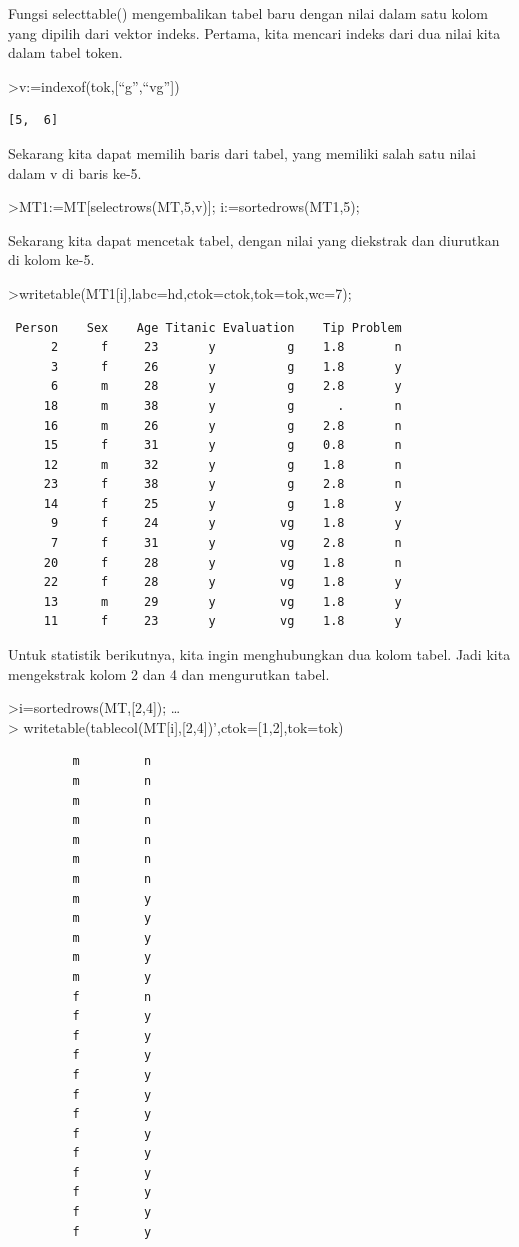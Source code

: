 \documentclass[
]{book}
\begin{document}
Fungsi selecttable() mengembalikan tabel baru dengan nilai dalam satu kolom yang dipilih dari vektor indeks. Pertama, kita mencari indeks dari dua nilai kita dalam tabel token.

\textgreater v:=indexof(tok,{[}``g'',``vg''{]})

\begin{verbatim}
[5,  6]
\end{verbatim}

Sekarang kita dapat memilih baris dari tabel, yang memiliki salah satu nilai dalam v di baris ke-5.

\textgreater MT1:=MT{[}selectrows(MT,5,v){]}; i:=sortedrows(MT1,5);

Sekarang kita dapat mencetak tabel, dengan nilai yang diekstrak dan diurutkan di kolom ke-5.

\textgreater writetable(MT1{[}i{]},labc=hd,ctok=ctok,tok=tok,wc=7);

\begin{verbatim}
 Person    Sex    Age Titanic Evaluation    Tip Problem
      2      f     23       y          g    1.8       n
      3      f     26       y          g    1.8       y
      6      m     28       y          g    2.8       y
     18      m     38       y          g      .       n
     16      m     26       y          g    2.8       n
     15      f     31       y          g    0.8       n
     12      m     32       y          g    1.8       n
     23      f     38       y          g    2.8       n
     14      f     25       y          g    1.8       y
      9      f     24       y         vg    1.8       y
      7      f     31       y         vg    2.8       n
     20      f     28       y         vg    1.8       n
     22      f     28       y         vg    1.8       y
     13      m     29       y         vg    1.8       y
     11      f     23       y         vg    1.8       y
\end{verbatim}

Untuk statistik berikutnya, kita ingin menghubungkan dua kolom tabel. Jadi kita mengekstrak kolom 2 dan 4 dan mengurutkan tabel.

\textgreater i=sortedrows(MT,{[}2,4{]}); \ldots{}\\
\textgreater{} writetable(tablecol(MT{[}i{]},{[}2,4{]})',ctok={[}1,2{]},tok=tok)

\begin{verbatim}
         m         n
         m         n
         m         n
         m         n
         m         n
         m         n
         m         n
         m         y
         m         y
         m         y
         m         y
         m         y
         f         n
         f         y
         f         y
         f         y
         f         y
         f         y
         f         y
         f         y
         f         y
         f         y
         f         y
         f         y
         f         y
\end{verbatim}
\end{document}
